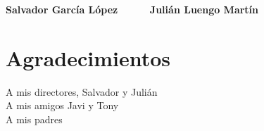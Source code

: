 \vspace{5cm}

\noindent \textbf{Salvador García López \ \ \ \ \ Julián  Luengo Martín}

\chapter*{Agradecimientos}
\thispagestyle{empty}

       \vspace{1cm}





\begin{flushright}
	A mis directores, Salvador y Julián \\
	\vspace{0.13cm}
	A mis amigos Javi y Tony\\
	\vspace{0.13cm}
	A mis padres
\end{flushright}
